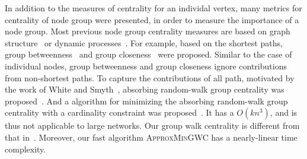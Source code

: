 \documentclass[10pt,twocolumn,twoside]{IEEEtran}
\begin{document}

In addition to the measures of centrality for an individal vertex,  many metrics for centrality of node group were presented, in order to measure the importance of a node group. Most previous  node group centrality measures are based on graph structure~\cite{XuReLiYuLi17} or dynamic processes~\cite{MaMaGi15}. For example, based on the shortest paths, group betweenness~\cite{DoelPuZi09,Yo14,MaTsUp16} and group closeness~\cite{EvBo99,ZhLuToGu14,BeGoMe18} were proposed. Similar to the case of individual nodes, group betweenness and group closeness ignore contributions from non-shortest paths. To capture the contributions of all path, motivated by the work of White and Smyth~\cite{WhSm03}, absorbing random-walk group centrality was proposed~\cite{MaMaGi15}. And a algorithm for minimizing the absorbing random-walk group centrality with a cardinality constraint was proposed~\cite{MaMaGi15}. It has a $O(kn^3)$, and is thus not applicable to large networks.
Our group walk centrality is different from that in~\cite{MaMaGi15}. Moreover,  our fast algorithm \textsc{ApproxMinGWC} has a nearly-linear time complexity.


\end{document}
